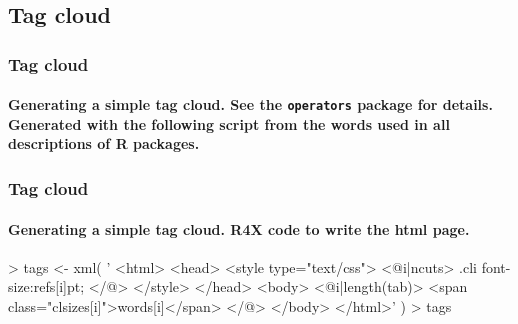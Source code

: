 \documentclass[smaller]{beamer}
\newcommand{\rfun}[1]{\texttt{#1}}
\begin{document}
\subsection{Tag cloud}
\begin{frame}[fragile]
\frametitle{Tag cloud}
\framesubtitle{Generating a simple tag cloud. See the \rfun{operators} package for details. Generated with the following script from the words used in all descriptions of R packages.}
\begin{Schunk}
\end{Schunk}
\end{frame}


\begin{frame}[fragile]
\frametitle{Tag cloud}
\framesubtitle{Generating a simple tag cloud. R4X code to write the html page.}
\begin{Schunk}
\begin{Sinput}
> tags <- xml( '
    <html>
      <head>
      <style type="text/css">
      <@i|ncuts>
            .cl{i}{
               font-size:{refs[i]}pt;
            }
      </@>
      </style>
      </head>
      <body>
        <@i|length(tab)>
          <span class="cl{sizes[i]}">{words[i]}</span>
        </@> 
      </body>
    </html>' )
>   tags %
\end{Sinput}
\end{Schunk}
\end{frame}
\end{document}

